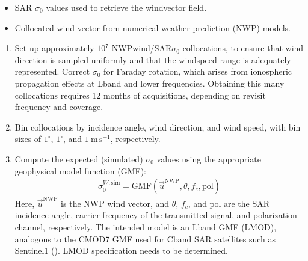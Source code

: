 \documentclass[a4paper,10pt,english]{sphinxmanual}
\begin{document}
\sphinxAtStartPar
{}
\begin{itemize}
\item {} 
\sphinxAtStartPar
SAR \(\sigma_0\) values used to retrieve the wind\sphinxhyphen{}vector field.

\item {} 
\sphinxAtStartPar
Collocated wind vector from numerical weather prediction (NWP) models.

\end{itemize}

\sphinxAtStartPar
{}
\begin{enumerate}
%
\item {} 
\sphinxAtStartPar
Set up approximately \(10^7\) NWP\sphinxhyphen{}wind/SAR\sphinxhyphen{}\(\sigma_0\)
collocations, to ensure that wind direction is sampled uniformly and that
the wind\sphinxhyphen{}speed range is adequately represented. Correct \(\sigma_0\)
for Faraday rotation, which arises from ionospheric propagation effects at
L\sphinxhyphen{}band and lower frequencies. Obtaining this many collocations requires
1\textendash{}2 months of acquisitions, depending on revisit frequency and coverage.

\item {} 
\sphinxAtStartPar
Bin collocations by incidence angle, wind direction, and wind speed, with
bin sizes of \(1^\circ\), \(1^\circ\), and \(1\ \mathrm{m\,s^{-1}}\),
respectively.

\item {} 
\sphinxAtStartPar
Compute the expected (simulated) \(\sigma_0\) values using the
appropriate geophysical model function (GMF):
\begin{equation*}
\begin{split}\sigma_{0}^{W,\mathrm{sim}}
= \mathrm{GMF}(\vec{u}^{\mathrm{NWP}}, \theta, f_c, \mathrm{pol})\end{split}
\end{equation*}
\sphinxAtStartPar
Here, \(\vec{u}^{\mathrm{NWP}}\) is the NWP wind vector, and
\(\theta\), \(f_c\), and \(\mathrm{pol}\) are the SAR incidence
angle, carrier frequency of the transmitted signal, and polarization
channel, respectively. The intended model is an L\sphinxhyphen{}band GMF (LMOD), analogous
to the CMOD7 GMF used for C\sphinxhyphen{}band SAR satellites such as Sentinel\sphinxhyphen{}1
({\hyperref[\detokenize{alg-01-calibration:ref-stoffelen-cmod7}]{}}). LMOD specification needs to be determined.


\end{enumerate}
\end{document}
